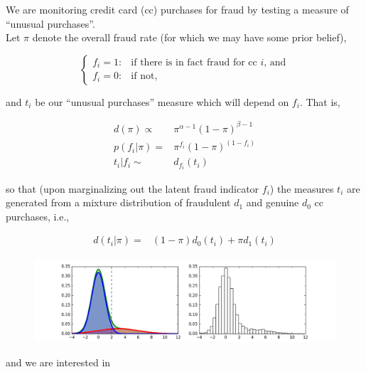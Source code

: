 \documentclass[11pt, oneside]{article}
\begin{document}

We are monitoring credit card (cc) purchases for fraud by testing a measure of ``unusual purchases''.\\

Let $\pi$ denote the overall fraud rate (for which we may have some prior belief), 

$$ \left\{  \begin{array}{ll} 
    f_i=1: & \textrm{if there is in fact fraud for cc $i$, and} \\
    f_i=0: & \textrm{if not,} 
   \end{array} \right.$$

\noindent and $t_i$ be our ``unusual purchases'' measure which will depend on $f_i$.  That is, 

\begin{align*}
d(\pi) \propto{}& \pi^{\alpha-1}(1-\pi)^{\beta-1} \\
p(f_i|\pi) ={}& \pi^{f_i}(1-\pi)^{(1-f_i)}  \\
t_i|f_i \sim{}& d_{f_i}(t_i) 
\end{align*}


\noindent so that (upon marginalizing out the latent fraud indicator $f_i$) the measures $t_i$ are generated from a mixture distribution of fraudulent $d_{1}$ and genuine $d_{0}$ cc purchases, i.e., 

\begin{align*}
d(t_i|\pi) ={}& (1-\pi)d_{0}(t_i) + \pi d_{1}(t_i)  
\end{align*}

\vspace{-1.5em}
\begin{figure}[h!]
   \centering
\includegraphics[width=7in]{fraud.png}  
\end{figure}  

\noindent and we are interested in 
\end{document}
